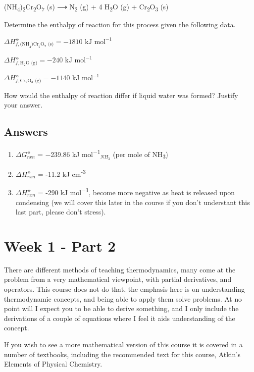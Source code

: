 \documentclass[
]{book}
\providecommand{\tightlist}{%
  \setlength{\itemsep}{0pt}\setlength{\parskip}{0pt}}
\begin{document}
(NH\textsubscript{4})\textsubscript{2}Cr\textsubscript{2}O\textsubscript{7} (s) ⟶ N\textsubscript{2} (g) + 4 H\textsubscript{2}O (g) + Cr\textsubscript{2}O\textsubscript{3} (s)

Determine the enthalpy of reaction for this process given the following data.

\(ΔH^⦵_{f, \textrm{(NH}_4\textrm{)Cr}_2\textrm{O}_7\textrm{ (s)}} = −1810 \textrm{ kJ mol}^{−1}\)

\(ΔH^⦵_{f, \textrm{H}_2 \textrm{O (g)}} = −240 \textrm{ kJ mol}^{−1}\)

\(ΔH^⦵_{f, \textrm{Cr}_2 \textrm{O}_3 \textrm{ (g)}} = −1140 \textrm{ kJ mol}^{−1}\)

How would the enthalpy of reaction differ if liquid water was formed? Justify your answer.

\hypertarget{sec:Answers1}{%
\section{Answers}\label{sec:Answers1}}

\begin{enumerate}
\def\labelenumi{\arabic{enumi}.}
\tightlist
\item
  \(ΔG_{rxn}^⦵\) = −239.86 kJ mol\textsuperscript{−1}\(_{NH_3}\) (per mole of NH\textsubscript{3})
\item
  \(ΔH_{rxn}^⦵\) = -11.2 kJ cm\textsuperscript{-3}
\item
  \(ΔH_{rxn}^⦵\) = -290 kJ mol\textsuperscript{−1}, become more negative as heat is released upon condensing (we will cover this later in the course if you don't understant this last part, please don't stress).
\end{enumerate}

\hypertarget{ch:Part2}{%
\chapter{Week 1 - Part 2}\label{ch:Part2}}

There are different methods of teaching thermodynamics, many come at the problem from a very mathematical viewpoint, with partial derivatives, and operators. This course does not do that, the emphasis here is on understanding thermodynamic concepts, and being able to apply them solve problems. At no point will I expect you to be able to derive something, and I only include the derivations of a couple of equations where I feel it aids understanding of the concept.

If you wish to see a more mathematical version of this course it is covered in a number of textbooks, including the recommended text for this course, Atkin's Elements of Physical Chemistry.
\end{document}
